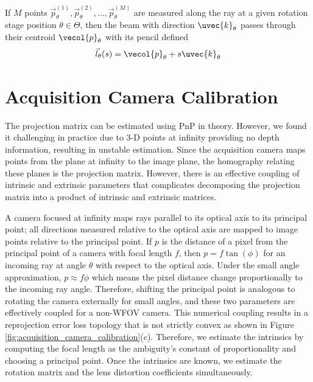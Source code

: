If $M$ points $\vec{p}_\theta^{(1)}, \vec{p}_\theta^{(2)}, ..., \vec{p}_\theta^{(M)}$ are measured along the ray at a given rotation stage position $\theta \in \Theta$, then the beam with direction $\uvec{k}_{\theta}$ passes through their centroid $\vecol{p}_\theta$ with its pencil defined
%
\begin{align}
    \vec{l}_\theta(s) = \vecol{p}_\theta + s \uvec{k}_{\theta}
\end{align}

\section{Acquisition Camera Calibration}
The projection matrix can be estimated using PnP in theory. However, we found it challenging in practice due to 3-D points at infinity providing no depth information, resulting in unstable estimation. Since the acquisition camera maps points from the plane at infinity to the image plane, the homography relating these planes is the projection matrix. However, there is an effective coupling of intrinsic and extrinsic parameters that complicates decomposing the projection matrix into a product of intrinsic and extrinsic matrices.

A camera focused at infinity maps rays parallel to its optical axis to its principal point; all directions measured relative to the optical axis are mapped to image points relative to the principal point. If $p$ is the distance of a pixel from the principal point of a camera with focal length $f$, then $p = f \tan(\phi)$ for an incoming ray at angle $\theta$ with respect to the optical axis. Under the small angle approximation, $p \approx f\phi$ which means the pixel distance change proportionally to the incoming ray angle. Therefore, shifting the principal point is analogous to rotating the camera externally for small angles, and these two parameters are effectively coupled for a non-WFOV camera. This numerical coupling results in a reprojection error loss topology that is not strictly convex as shown in Figure \ref{fig:acquisition_camera_calibration}(c). Therefore, we estimate the intrinsics by computing the focal length as the ambiguity's constant of proportionality and choosing a principal point. Once the intrinsics are known, we estimate the rotation matrix and the lens distortion coefficients simultaneously.

